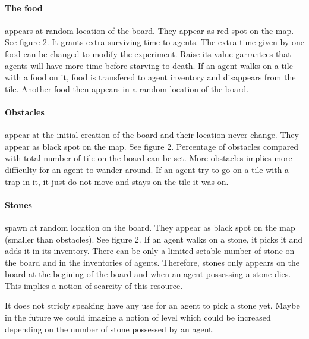 \documentclass{article}
\begin{document}
\paragraph{The food}
appears at random location of the board. They appear as red spot on the map. See figure 2. It grants extra surviving time to agents. The extra time given by one food can be changed to modify the experiment. Raise its value garrantees that agents will have more time before starving to death. If an agent walks on a tile with a food on it, food is transfered to agent inventory and disappears from the tile. Another food then appears in a random location of the board.

\paragraph{Obstacles}
appear at the initial creation of the board and their location never change. They appear as black spot on the map. See figure 2. Percentage of obstacles compared with total number of tile on the board can be set. More obstacles implies more difficulty for an agent to wander around. If an agent try to go on a tile with a trap in it, it just do not move and stays on the tile it was on.

\paragraph{Stones}
spawn at random location on the board. They appear as black spot on the map (smaller than obstacles). See figure 2. If an agent walks on a stone, it picks it and adds it in its inventory. There can be only a limited setable number of stone on the board and in the inventories of agents. Therefore, stones only appears on the board at the begining of the board and when an agent possessing a stone dies. This implies a notion of scarcity of this resource. \par
It does not stricly speaking have any use for an agent to pick a stone yet. Maybe in the future we could imagine a notion of level which could be increased depending on the number of stone possessed by an agent.
\end{document}
